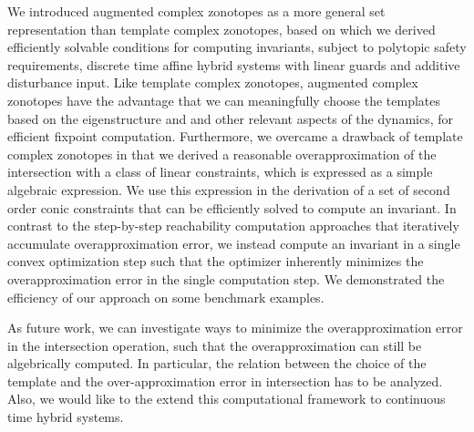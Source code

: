 We introduced augmented complex zonotopes as a more general set
representation than template complex zonotopes, based on which we
derived efficiently solvable conditions for computing invariants,
subject to polytopic safety requirements, discrete time affine hybrid
systems with linear guards and additive disturbance input.  Like
template complex zonotopes, augmented complex zonotopes have the
advantage that we can meaningfully choose the templates based on the
eigenstructure and and other relevant aspects of the dynamics, for
efficient fixpoint computation.  Furthermore, we overcame a drawback
of template complex zonotopes in that we derived a reasonable
overapproximation of the intersection with a class of linear
constraints, which is expressed as a simple algebraic expression.  We
use this expression in the derivation of a set of second order conic
constraints that can be efficiently solved to compute an invariant.
In contrast to the step-by-step reachability computation approaches
that iteratively accumulate overapproximation error, we
instead compute an invariant in a single convex optimization step such
that the optimizer inherently minimizes the overapproximation error in
the single computation step.  We demonstrated the efficiency of our
approach on some benchmark examples.

As future work, we can investigate ways to minimize the
overapproximation error in the intersection operation, such that the
overapproximation can still be algebrically computed.  In particular,
the relation between the choice of the template and the
over-approximation error in intersection has to be analyzed.  Also, we
would like to the extend this computational framework to continuous
time hybrid systems.
